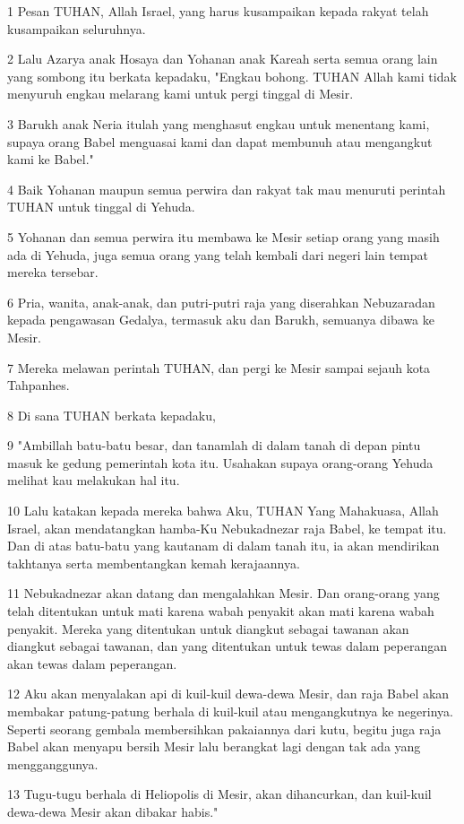 \par 1 Pesan TUHAN, Allah Israel, yang harus kusampaikan kepada rakyat telah kusampaikan seluruhnya.
\par 2 Lalu Azarya anak Hosaya dan Yohanan anak Kareah serta semua orang lain yang sombong itu berkata kepadaku, "Engkau bohong. TUHAN Allah kami tidak menyuruh engkau melarang kami untuk pergi tinggal di Mesir.
\par 3 Barukh anak Neria itulah yang menghasut engkau untuk menentang kami, supaya orang Babel menguasai kami dan dapat membunuh atau mengangkut kami ke Babel."
\par 4 Baik Yohanan maupun semua perwira dan rakyat tak mau menuruti perintah TUHAN untuk tinggal di Yehuda.
\par 5 Yohanan dan semua perwira itu membawa ke Mesir setiap orang yang masih ada di Yehuda, juga semua orang yang telah kembali dari negeri lain tempat mereka tersebar.
\par 6 Pria, wanita, anak-anak, dan putri-putri raja yang diserahkan Nebuzaradan kepada pengawasan Gedalya, termasuk aku dan Barukh, semuanya dibawa ke Mesir.
\par 7 Mereka melawan perintah TUHAN, dan pergi ke Mesir sampai sejauh kota Tahpanhes.
\par 8 Di sana TUHAN berkata kepadaku,
\par 9 "Ambillah batu-batu besar, dan tanamlah di dalam tanah di depan pintu masuk ke gedung pemerintah kota itu. Usahakan supaya orang-orang Yehuda melihat kau melakukan hal itu.
\par 10 Lalu katakan kepada mereka bahwa Aku, TUHAN Yang Mahakuasa, Allah Israel, akan mendatangkan hamba-Ku Nebukadnezar raja Babel, ke tempat itu. Dan di atas batu-batu yang kautanam di dalam tanah itu, ia akan mendirikan takhtanya serta membentangkan kemah kerajaannya.
\par 11 Nebukadnezar akan datang dan mengalahkan Mesir. Dan orang-orang yang telah ditentukan untuk mati karena wabah penyakit akan mati karena wabah penyakit. Mereka yang ditentukan untuk diangkut sebagai tawanan akan diangkut sebagai tawanan, dan yang ditentukan untuk tewas dalam peperangan akan tewas dalam peperangan.
\par 12 Aku akan menyalakan api di kuil-kuil dewa-dewa Mesir, dan raja Babel akan membakar patung-patung berhala di kuil-kuil atau mengangkutnya ke negerinya. Seperti seorang gembala membersihkan pakaiannya dari kutu, begitu juga raja Babel akan menyapu bersih Mesir lalu berangkat lagi dengan tak ada yang mengganggunya.
\par 13 Tugu-tugu berhala di Heliopolis di Mesir, akan dihancurkan, dan kuil-kuil dewa-dewa Mesir akan dibakar habis."


